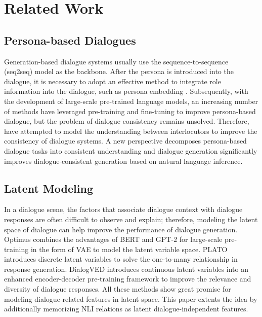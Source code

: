\documentclass[letterpaper]{article} \usepackage{aaai23}  \usepackage{times}  \usepackage{helvet}  \usepackage{courier}  \usepackage[hyphens]{url}  \usepackage{graphicx} \urlstyle{rm} \def\UrlFont{\rm}  \usepackage{natbib}  \usepackage{caption} \frenchspacing  \setlength{\pdfpagewidth}{8.5in}  \setlength{\pdfpageheight}{11in}  \usepackage{algorithm}
\begin{document}
\section{Related Work}
\subsection{Persona-based Dialogues}
Generation-based dialogue systems usually use the sequence-to-sequence (seq2seq) model \cite{Sutskever2014} as the backbone. After the persona is introduced into the dialogue, it is necessary to adopt an effective method to integrate role information into the dialogue, such as persona embedding \cite{Li2016}. Subsequently, with the development of large-scale pre-trained language models, an increasing number of methods \cite{Wolf2019,Roller2021,Lin2021,Zheng2020} have leveraged pre-training and fine-tuning to improve persona-based dialogue, but the problem of dialogue consistency remains unsolved. Therefore, \citet{Liu2020} have attempted to model the understanding between interlocutors to improve the consistency of dialogue systems. A new perspective \cite{Song2021} decomposes persona-based dialogue tasks into consistent understanding and dialogue generation significantly improves dialogue-consistent generation based on natural language inference.

\subsection{Latent Modeling}
In a dialogue scene, the factors that associate dialogue context with dialogue responses are often difficult to observe and explain; therefore, modeling the latent space of dialogue can help improve the performance of dialogue generation. Optimus \cite{Li2020} combines the advantages of BERT \cite{Devlin2019} and GPT-2 \cite{AlecRadfordJeffreyWuRewonChildDavidLuanDarioAmodei2020} for large-scale pre-training in the form of VAE \cite{Kingma2014} to model the latent variable space. PLATO \cite{Bao2020} introduces discrete latent variables to solve the one-to-many relationship in response generation. DialogVED \cite{Chen2022} introduces continuous latent variables into an enhanced encoder-decoder pre-training framework to improve the relevance and diversity of dialogue responses. All these methods show great promise for modeling dialogue-related features in latent space. This paper extents the idea by additionally memorizing NLI relations as latent dialogue-independent features.
\end{document}
